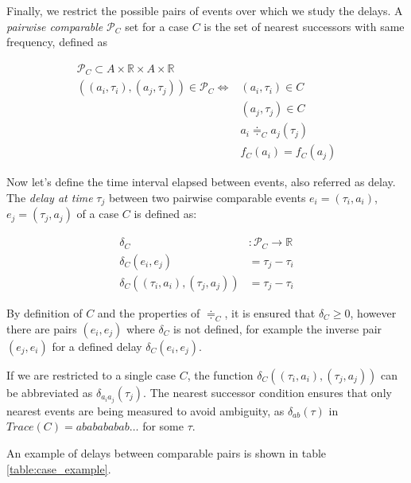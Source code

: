 \documentclass{article}
\begin{document}
Finally, we restrict the possible pairs of events over which we study the delays. A \emph{pairwise comparable} $\mathcal{P}_C$ set for a case $C$ is the set of nearest successors with same frequency, defined as

\begin{equation} \label{eq:pairwaise_comparable}
\begin{split}
     \mathcal{P}_C \subset A \times \mathbb{R} \times A \times \mathbb{R} \\
     ((a_i, \tau_i), (a_j,\tau_j)) \in \mathcal{P}_C \iff & (a_i, \tau_i) \in C \\
     & (a_j,\tau_j) \in C \\
     & a_i \doteqdot_C a_j(\tau_j) \\
     & f_C(a_i) = f_C(a_j)
\end{split}
\end{equation}



Now let's define the time interval elapsed between events, also referred as delay. The \emph{delay at time} $\tau_j$ between two pairwise comparable events $e_i=(\tau_i, a_i)$, $e_j=(\tau_j, a_j)$ of a case $C$ is defined as:

\begin{equation} \label{eq:comparable_delays}
\begin{split}
    \delta_C & : \mathcal{P}_C \rightarrow \mathbb{R} \\
    \delta_C( e_i, e_j ) & = \tau_j - \tau_i \\
    \delta_C( (\tau_i,a_i), (\tau_j, a_j) ) & = \tau_j - \tau_i 
\end{split}
\end{equation}

By definition of $C$ and the properties of $\doteqdot_C$, it is ensured that $\delta_C \geq 0$, however there are pairs $( e_i, e_j )$ where $\delta_C$ is not defined, for example the inverse pair $(e_j, e_i)$ for a defined delay $\delta_C( e_i, e_j )$. 

If we are restricted to a single case $C$, the function $\delta_C( (\tau_i,a_i), (\tau_j, a_j) )$ can be abbreviated as $\delta_{a_ia_j}(\tau_j)$. The nearest successor condition ensures that only nearest events are being measured to avoid ambiguity, as $\delta_{ab}(\tau)$ in $Trace(C)=ababababab \dots$ for some $\tau$. 

An example of delays between comparable pairs is shown in table \ref{table:case_example}.
\end{document}
